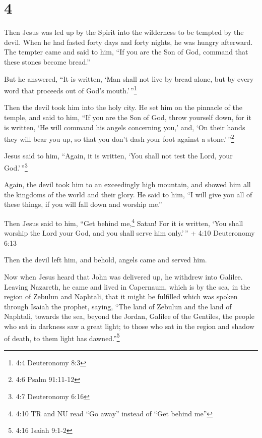 \hypertarget{section-3}{%
\section{4}\label{section-3}}

 Then Jesus was led up by the Spirit into the wilderness to
be tempted by the devil.  When he had fasted forty days and
forty nights, he was hungry afterward.  The tempter came and
said to him, ``If you are the Son of God, command that these stones
become bread.''

 But he answered, ``It is written, `Man shall not live by
bread alone, but by every word that proceeds out of God's
mouth.'\,''\footnote{4:4 Deuteronomy 8:3}

 Then the devil took him into the holy city. He set him on
the pinnacle of the temple,  and said to him, ``If you are
the Son of God, throw yourself down, for it is written, `He will command
his angels concerning you,' and, `On their hands they will bear you up,
so that you don't dash your foot against a stone.'\,''\footnote{4:6
  Psalm 91:11-12}

 Jesus said to him, ``Again, it is written, `You shall not
test the Lord, your God.'\,''\footnote{4:7 Deuteronomy 6:16}

 Again, the devil took him to an exceedingly high mountain,
and showed him all the kingdoms of the world and their glory.
 He said to him, ``I will give you all of these things, if
you will fall down and worship me.''

 Then Jesus said to him, ``Get behind me,\footnote{4:10 TR
  and NU read ``Go away'' instead of ``Get behind me''} Satan! For it is
written, `You shall worship the Lord your God, and you shall serve him
only.'\,'' + 4:10 Deuteronomy 6:13

 Then the devil left him, and behold, angels came and
served him.

 Now when Jesus heard that John was delivered up, he
withdrew into Galilee.  Leaving Nazareth, he came and lived
in Capernaum, which is by the sea, in the region of Zebulun and
Naphtali,  that it might be fulfilled which was spoken
through Isaiah the prophet, saying,  ``The land of Zebulun
and the land of Naphtali, towards the sea, beyond the Jordan, Galilee of
the Gentiles,  the people who sat in darkness saw a great
light; to those who sat in the region and shadow of death, to them light
has dawned.''\footnote{4:16 Isaiah 9:1-2}

